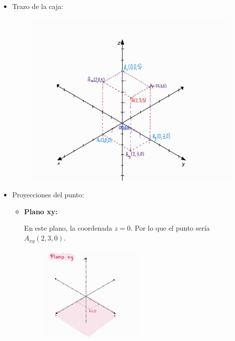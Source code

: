 \documentclass[12pt]{article}
\begin{document}
\begin{itemize}
  
\item Trazo de la caja:
  
  \begin{figure}[H]
    \centering
    \includegraphics[width=1\textwidth]{./img/caja.jpeg}
  \end{figure}
  
\item Proyecciones del punto:
  \begin{itemize}
    
  \item \textbf{Plano xy:}
    
    En este plano, la coordenada $z=0$. Por lo que el punto sería $A_{xy}(2, 3, 0)$.
     \begin{figure}[H]
    \centering
    \includegraphics[width=0.5\textwidth]{./img/interxy.jpeg}
     \end{figure}
     

\end{itemize}
\end{itemize}
\end{document}
